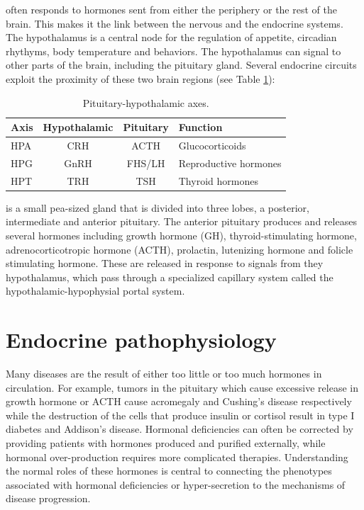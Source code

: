 \documentclass{tufte-handout}
\begin{document}
 often responds to hormones sent from either the periphery or the rest of the brain.  This makes it the link between the nervous and the endocrine systems.  The hypothalamus is a central node for the regulation of appetite, circadian rhythyms, body temperature and behaviors.  The hypothalamus can signal to other parts of the brain, including the pituitary gland.  Several endocrine circuits exploit the proximity of these two brain regions (see Table \ref{tab:pituitary-axes}):

\begin{table}
  \centering
  \begin{tabular}{lccl}
    \toprule
    Axis & Hypothalamic & Pituitary & Function \\
    \midrule
    HPA & CRH & ACTH & Glucocorticoids \\
    HPG & GnRH & FHS/LH & Reproductive hormones \\
    HPT & TRH & TSH & Thyroid hormones \\
    \bottomrule
  \end{tabular}
  \caption{Pituitary-hypothalamic axes.}
  \label{tab:pituitary-axes}
\end{table}

 is a small pea-sized gland that is divided into three lobes, a posterior, intermediate and anterior pituitary.  The anterior pituitary produces and releases several hormones including growth hormone (GH), thyroid-stimulating hormone, adrenocorticotropic hormone (ACTH), prolactin, lutenizing hormone and folicle stimulating hormone.  These are released in response to signals from they hypothalamus, which pass through a specialized capillary system called the hypothalamic-hypophysial portal system.    

\section{Endocrine pathophysiology}

Many diseases are the result of either too little or too much hormones in circulation.  For example, tumors in the pituitary which cause excessive release in growth hormone or ACTH cause acromegaly\cite{Marie1907} and Cushing's disease\cite{Cushing1932} respectively while the destruction of the cells that produce insulin or cortisol result in type I diabetes\cite{Banting1922b} and Addison's disease\cite{Addison1855}.  Hormonal deficiencies can often be corrected by providing patients with hormones produced and purified externally, while hormonal over-production requires  more complicated therapies.  Understanding the normal roles of these hormones is central to connecting the phenotypes associated with hormonal deficiencies or hyper-secretion to the mechanisms of disease progression.


\end{document}
